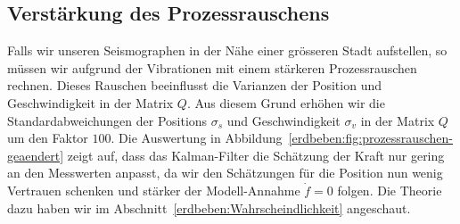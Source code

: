\subsection{Verstärkung des Prozessrauschens}
Falls wir unseren Seismographen in der Nähe einer grösseren Stadt aufstellen, so müssen wir aufgrund der Vibrationen mit einem stärkeren Prozessrauschen rechnen.
Dieses Rauschen beeinflusst die Varianzen der Position und Geschwindigkeit in der Matrix $Q$.
Aus diesem Grund erhöhen wir die Standardabweichungen der Positions $\sigma_s$ und Geschwindigkeit $\sigma_v$ in der Matrix $Q$ um den Faktor $100$.
Die Auswertung in Abbildung~\ref{erdbeben:fig:prozessrauschen-geaendert} zeigt auf,
dass das Kalman-Filter die Schätzung der Kraft nur gering an den Messwerten anpasst,
da wir den Schätzungen für die Position nun wenig Vertrauen schenken und stärker der Modell-Annahme $\dot f = 0$ folgen.
Die Theorie dazu haben wir im Abschnitt~\ref{erdbeben:Wahrscheindlichkeit} angeschaut.

